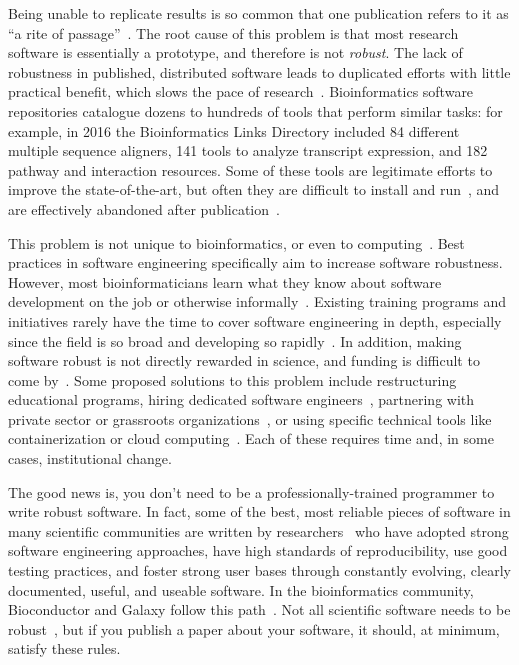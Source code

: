 \documentclass[10pt,letterpaper]{article}
\newcommand{\reviewed}[1]{{\color{black}#1}}
\begin{document}
Being unable to
replicate results is so common that one publication refers to it as ``a rite of
passage''~\cite{baker2016}.
The root cause of this problem is that most research software
\reviewed{ is essentially a prototype, and therefore is not
\emph{robust}. The lack of
robustness in published, distributed software
leads to duplicated efforts with little practical benefit,}
which slows the pace of research~\cite{prabhu2011,lawlor2015}.
Bioinformatics software repositories \cite{ison2016,brazas2012} catalogue dozens to
hundreds of tools that perform similar tasks:
for example,
in 2016 the Bioinformatics Links Directory included 84 different multiple sequence aligners, 141 tools
to analyze transcript expression, and 182 pathway and interaction resources.
Some of these tools are legitimate efforts to improve the state-of-the-art, but
often they are difficult to install and run~\cite{stajich2002,Seemann2013}, and are effectively abandoned
after publication~\cite{nekrutenko2012}.

This problem is not unique to bioinformatics, or even to computing~\cite{baker2016}.
Best practices in software engineering specifically aim to increase software
robustness. However, most bioinformaticians learn what they know about software development
on the job or otherwise informally~\cite{prins2015,atwood2015}.
Existing training programs and initiatives rarely have the time to cover software engineering
in depth, especially since the field is so broad and developing so rapidly~\cite{atwood2015,lawlor2015}.
In addition, making software robust is not directly rewarded
in science, and funding is difficult to come by~\cite{prins2015}. Some proposed
solutions to this problem include restructuring educational programs,
hiring dedicated software engineers~\cite{lawlor2015,sanders2008},
partnering with private sector or grassroots organizations~\cite{prins2015,ison2016},
or using specific technical tools like containerization or cloud
computing~\cite{afgan2016,howe2012}. Each of these requires time and, in some
cases, institutional change.

The good news is,
you don't need to be a professionally-trained programmer to write robust software.
In fact,
some of the best, most reliable pieces of software in many scientific
communities are written by researchers~\cite{prabhu2011,sanders2008}
who have adopted strong software
engineering approaches, have high standards of reproducibility, use good testing
practices, and foster 
\reviewed{strong user
bases through constantly evolving, clearly documented, useful, and useable software.}
In the bioinformatics community, Bioconductor and Galaxy follow this
path~\cite{gentleman2004,afgan2016}.
\reviewed{Not all scientific software needs to be robust~\cite{varoquaux2015}, but if you
publish a paper about your software, it should, at minimum, satisfy these
rules.}
\end{document}
